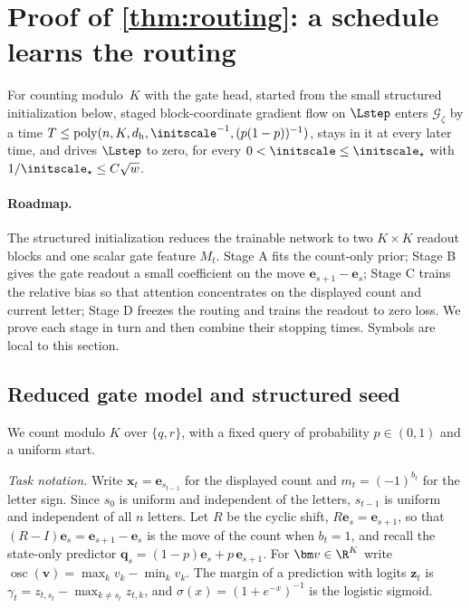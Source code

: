 \section{Proof of \texorpdfstring{\cref{thm:routing}}{Staged step learning}: a schedule learns the routing}
\label{app:routing}

\begin{restated}{}
For counting modulo~$K$ with the gate head, started from the small structured initialization below, staged block-coordinate
gradient flow on $\Lstep$ enters $\mathcal G_\zeta$ by a time $T\le\mathrm{poly}(n,K,d_{\mathrm h},\initscale^{-1},(p(1-p))^{-1})$,
stays in it at every later time, and drives $\Lstep$ to zero, for every $0<\initscale\le\initscale_\star$ with
$1/\initscale_\star\le C\sqrt w$.
\end{restated}

\paragraph{Roadmap.} The structured initialization reduces the trainable network to two $K\times K$ readout blocks and one
scalar gate feature $M_t$. Stage A fits the count-only prior; Stage B gives the gate readout a small coefficient on the move
$\bm e_{s+1}-\bm e_s$; Stage C trains the relative bias so that attention concentrates on the displayed count and current letter;
Stage D freezes the routing and trains the readout to zero loss. We prove each stage in turn and then combine their stopping times.
Symbols are local to this section.

\subsection{Reduced gate model and structured seed}
We count modulo $K$ over $\{q,r\}$, with a fixed query of probability $p\in(0,1)$ and a uniform start.

\emph{Task notation.} Write $\bm x_t=\bm e_{s_{t-1}}$ for the displayed count and $m_t=(-1)^{b_t}$ for the letter sign. Since $s_0$ is
uniform and independent of the letters, $s_{t-1}$ is uniform and independent of all $n$ letters. Let $R$ be the cyclic shift,
$R\bm e_s=\bm e_{s+1}$, so that $(R-I)\bm e_s=\bm e_{s+1}-\bm e_s$ is the move of the count when $b_t=1$, and recall the state-only predictor
$\bm q_s=(1-p)\bm e_s+p\,\bm e_{s+1}$. For $\bm v\in\R^K$ write $\operatorname{osc}(\bm v)=\max_k v_k-\min_k v_k$. The margin of a
prediction with logits $\bm z_t$ is $\gamma_t=z_{t,s_t}-\max_{k\ne s_t}z_{t,k}$, and $\sigma(x)=(1+e^{-x})^{-1}$ is the logistic sigmoid.

